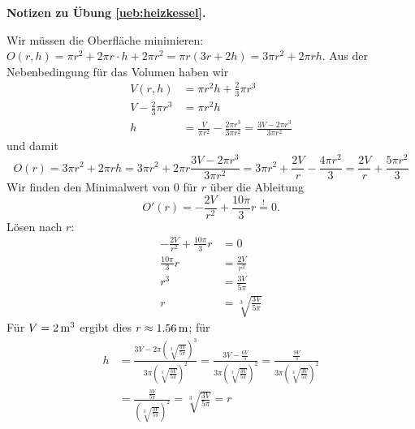 \documentclass[%
11pt,%
twoside,%
titlepage,%
german,%
headsepline%
]{scrartcl}
\theoremstyle{definition}
\theoremstyle{plain}
\newcommand{\concatueb}[1]{ueb:#1}%
\newcommand{\concatlsg}[1]{lsg:#1}%
\newenvironment{lsg}[1]{%
    \par\noindent\textbf{Notizen zu Übung \ref{\concatueb{#1}}.}%
    \label{\concatlsg{#1}}
}{%
    \par%
}
\begin{document}
\begin{lsg}{heizkessel}
     Wir müssen die Oberfläche minimieren: $O(r,h)=\pi r^2+2\pi r\cdot h+2\pi r^2=\pi r(3r+2h)=3\pi r^2+2\pi rh$. Aus der Nebenbedingung für das Volumen haben wir
     \begin{align*}
         V(r,h) &= \pi r^2h+\frac{2}{3}\pi r^3\\
         V-\frac{2}{3}\pi r^3 &= \pi r^2h\\
         h &= \frac{V}{\pi r^2}-\frac{2\pi r^3}{3\pi r^2}=\frac{3V-2\pi r^3}{3\pi r^2}
     \end{align*}
     und damit
     $$O(r) = 3\pi r^2+2\pi rh = 3\pi r^2+2\pi r\frac{3V-2\pi r^3}{3\pi r^2}=3\pi r^2+\frac{2V}{r}-\frac{4\pi r^2}{3}=\frac{2V}{r}+\frac{5\pi r^2}{3}$$
     Wir finden den Minimalwert von $0$ für $r$ über die Ableitung
     $$O'(r)=-\frac{2V}{r^2}+\frac{10\pi}{3}r\stackrel{!}{=}0.$$
     Lösen nach $r$:
     \begin{align*}
         -\frac{2V}{r^2}+\frac{10\pi}{3}r &= 0\\
         \frac{10\pi}{3}r &= \frac{2V}{r^2}\\
         r^3 &= \frac{3V}{5\pi}\\
         r &= \sqrt[3]{\frac{3V}{5\pi}}
     \end{align*}
     Für $V=\unit[2]{m^3}$ ergibt dies $r\approx\unit[1.56]{m}$; für
     \begin{align*}
         h &= \frac{3V-2\pi \left(\sqrt[3]{\frac{3V}{5\pi}}\right)^3}{3\pi \left(\sqrt[3]{\frac{3V}{5\pi}}\right)^2}=\frac{3V- \frac{6V}{5}}{3\pi \left(\sqrt[3]{\frac{3V}{5\pi}}\right)^2}
         = \frac{\frac{9V}{5}}{3\pi \left(\sqrt[3]{\frac{3V}{5\pi}}\right)^2}\\
         &= \frac{\frac{3V}{5\pi}}{\left(\sqrt[3]{\frac{3V}{5\pi}}\right)^2}=\sqrt[3]{\frac{3V}{5\pi}}=r
     \end{align*}
\end{lsg}
\end{document}
